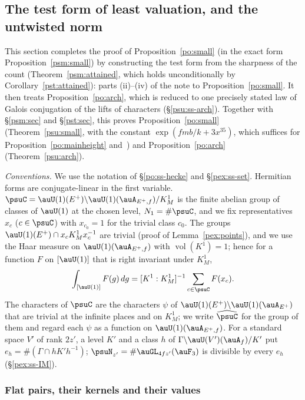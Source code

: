 \documentclass[10pt]{amsart}
\theoremstyle{definition}
\theoremstyle{remark}
\begin{document}
\subsection{The test form of least valuation, and the untwisted norm}\label{psu:sec}

This section completes the proof of Proposition~\ref{po:small} (in the exact form
Proposition~\ref{psm:small}) by constructing the test form from the sharpness of the count
(Theorem~\ref{psm:attained}, which holds unconditionally by Corollary~\ref{pst:attained}): parts
(ii)--(iv) of the note to Proposition~\ref{po:small}. It then treats Proposition~\ref{po:arch},
which is reduced to one precisely stated law of Galois conjugation of the lifts of characters
(\S\ref{psu:ss-arch}). Together with \S\ref{psm:sec} and \S\ref{pst:sec}, this proves Proposition~\ref{po:small}
(Theorem~\ref{psu:small}, with the constant $\exp(fmb/k+3x^{35})$, which suffices for
Proposition~\ref{po:mainheight} and~{\cite[Proposition~14.42]{P46}}) and Proposition~\ref{po:arch} (Theorem~\ref{psu:arch}).

\emph{Conventions.} We use the notation of \S\ref{po:ss-hecke} and \S\ref{pex:ss-set}. Hermitian
forms are conjugate-linear in the first variable. $\psuC=\auU(1)(E^+)\backslash\auU(1)(\auA_{E^+,f})/
K^1_M$ is the finite abelian group of classes of $\auU(1)$ at the chosen level, $N_1=\#\psuC$, and
we fix representatives $x_c$ ($c\in\psuC$) with $x_{c_0}=1$ for the trivial class $c_0$. The groups
$\auU(1)(E^+)\cap x_cK^1_Mx_c^{-1}$ are trivial (proof of Lemma~\ref{pex:points}), and we use the
Haar measure on $\auU(1)(\auA_{E^+,f})$ with $\operatorname{vol}(K^1)=1$; hence for a function $F$ on
$[\auU(1)]$ that is right invariant under $K^1_M$,
\begin{equation}\label{psu:eq-int}
\int_{[\auU(1)]}F(g)\,dg=[K^1:K^1_M]^{-1}\sum_{c\in\psuC}F(x_c).
\end{equation}
The characters of $\psuC$ are the characters $\psi$ of $\auU(1)(E^+)\backslash\auU(1)(\auA_{E^+})$
that are trivial at the infinite places and on $K^1_M$; we write $\widehat\psuC$ for the group of
them and regard each $\psi$ as a function on $\auU(1)(\auA_{E^+,f})$. For a standard space $V'$ of
rank $2z'$, a level $K'$ and a class $h$ of $\Gamma\backslash\auU(V')(\auA_f)/K'$ put
$e_h=\#(\Gamma\cap hK'h^{-1})$; $\psuN_{z'}=\#\auGL_{4fz'}(\auF_3)$ is divisible by every $e_h$
(\S\ref{pex:ss-IM}).

\subsubsection{Flat pairs, their kernels and their values}\label{psu:ss-flat}
\end{document}
